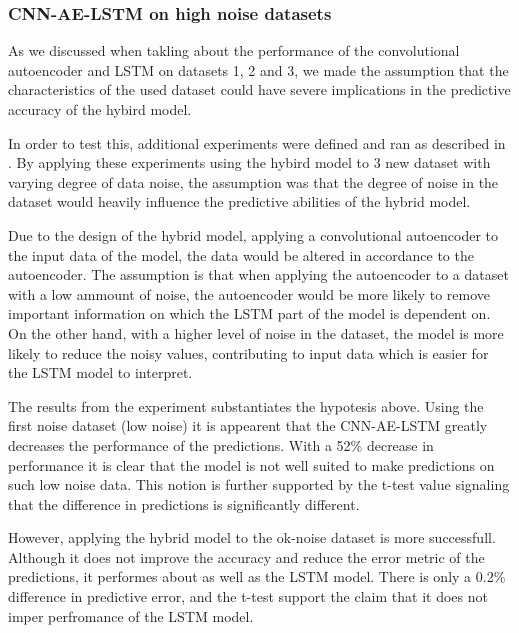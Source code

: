 \subsubsection{CNN-AE-LSTM on high noise datasets}

As we discussed when takling about the performance of the convolutional autoencoder and LSTM on datasets 1, 2 and 3,
we made the assumption that the characteristics of the used dataset could have severe implications in the predictive accuracy of the hybird model.

In order to test this, additional experiments were defined and ran as described in .
By applying these experiments using the hybird model to 3 new dataset with varying degree of data noise,
the assumption was that the degree of noise in the dataset would heavily influence the predictive abilities of the hybrid model.

Due to the design of the hybrid model, applying a convolutional autoencoder to the input data of the model,
the data would be altered in accordance to the autoencoder.
The assumption is that when applying the autoencoder to a dataset with a low ammount of noise,
the autoencoder would be more likely to remove important information on which the LSTM part of the model is dependent on.
On the other hand, with a higher level of noise in the dataset,
the model is more likely to reduce the noisy values, contributing to input data which is easier for the LSTM model to interpret.


The results from the experiment substantiates the hypotesis above.
Using the first noise dataset (low noise) it is appearent that the CNN-AE-LSTM greatly decreases the performance of the predictions.
With a 52\% decrease in performance it is clear that the model is not well suited to make predictions on such low noise data.
This notion is further supported by the t-test value signaling that the difference in predictions is significantly different.

However, applying the hybrid model to the ok-noise dataset is more successfull.
Although it does not improve the accuracy and reduce the error metric of the predictions,
it performes about as well as the LSTM model. There is only a 0.2\% difference in predictive error,
and the t-test support the claim that it does not imper perfromance of the LSTM model.

